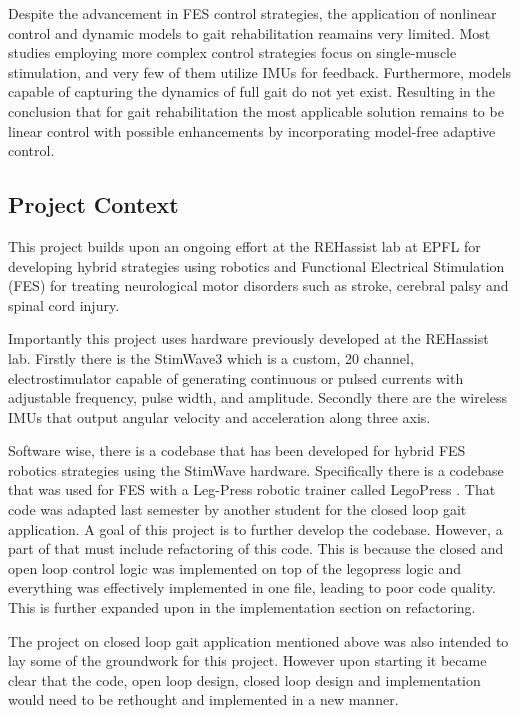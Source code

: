 Despite the advancement in FES control strategies, the application of nonlinear control and dynamic models to gait rehabilitation reamains very limited. Most studies employing more complex control strategies focus on single-muscle stimulation, and very few of them utilize IMUs for feedback. Furthermore, models capable of capturing the dynamics of full gait do not yet exist. Resulting in the conclusion that for gait rehabilitation the most applicable solution remains to be linear control with possible enhancements by incorporating model-free adaptive control.



\subsection{Project Context}

This project builds upon an ongoing effort at the REHassist lab at EPFL for developing hybrid strategies using robotics and Functional Electrical Stimulation (FES) for treating neurological motor disorders such as stroke, cerebral palsy and spinal cord injury. 

Importantly this project uses hardware previously developed at the REHassist lab. Firstly there is the StimWave3 which is a custom, 20 channel, electrostimulator capable of generating continuous or pulsed currents with adjustable frequency, pulse width, and amplitude. Secondly there are the wireless IMUs that output angular velocity and acceleration along three axis. 

Software wise, there is a codebase that has been developed for hybrid FES robotics strategies using the StimWave hardware. Specifically there is a codebase that was used for FES with a Leg-Press robotic trainer called LegoPress \cite{olivier_legopress_2014}. That code was adapted last semester by another student for the closed loop gait application. A goal of this project is to further develop the codebase. However, a part of that must include refactoring of this code. This is because the closed and open loop control logic was implemented on top of the legopress logic and everything was effectively implemented in one file, leading to poor code quality. This is further expanded upon in the implementation section on refactoring.

The project on closed loop gait application mentioned above was also intended to lay some of the groundwork for this project. However upon starting it became clear that the code, open loop design, closed loop design and implementation would need to be rethought and implemented in a new manner.

